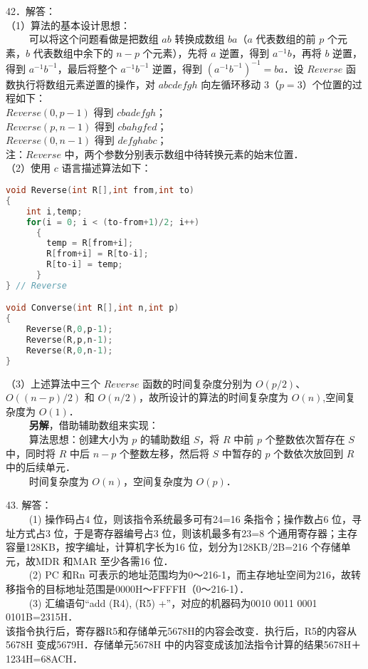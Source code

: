 42．解答：\\
（1）算法的基本设计思想：\\
$\qquad$ 可以将这个问题看做是把数组 $ab$ 转换成数组 $ba$（$a$ 代表数组的前 $p$ 个元素，$b$ 代表数组中余下的 $n-p$ 个元素），先将 $a$ 逆置，得到 $a^{-1}b$，再将 $b$ 逆置，得到 $a^{-1}b^{-1}$，最后将整个 $a^{-1}b^{-1}$ 逆置，得到 $(a^{-1}b^{-1})^{-1}=ba$．设 $Reverse$ 函数执行将数组元素逆置的操作，对 $abcdefgh$ 向左循环移动 $3$（$p=3$）个位置的过程如下：\\
$Reverse(0,p-1)$ 得到 $cbadefgh$； \\
$Reverse(p,n-1)$ 得到 $cbahgfed$； \\
$Reverse(0,n-1)$ 得到 $defghabc$； \\
注：$Reverse$ 中，两个参数分别表示数组中待转换元素的始末位置． \\
（2）使用 $c$ 语言描述算法如下：
\begin{lstlisting}[language=cpp]
void Reverse(int R[],int from,int to)
{
    int i,temp;
    for(i = 0; i < (to-from+1)/2; i++)
      {
        temp = R[from+i];
        R[from+i] = R[to-i];
        R[to-i] = temp;
      }
} // Reverse

void Converse(int R[],int n,int p)
{
    Reverse(R,0,p-1);
    Reverse(R,p,n-1);
    Reverse(R,0,n-1);
}
\end{lstlisting}
（3）上述算法中三个 $Reverse$ 函数的时间复杂度分别为 $O(p/2)$、$O((n-p)/2)$ 和 $O(n/2)$，故所设计的算法的时间复杂度为 $O(n)$,空间复杂度为 $O(1)$．\\
$\qquad$ \textbf{另解}，借助辅助数组来实现：\\
$\qquad$ 算法思想：创建大小为 $p$ 的辅助数组 $S$，将 $R$ 中前 $p$ 个整数依次暂存在 $S$ 中，同时将 $R$ 中后 $n-p$ 个整数左移，然后将 $S$ 中暂存的 $p$ 个数依次放回到 $R$ 中的后续单元．\\
$\qquad$ 时间复杂度为 $O(n)$，空间复杂度为 $O(p)$．

43. 解答：\\
$\qquad$ (1) 操作码占4 位，则该指令系统最多可有24=16 条指令；操作数占6 位，寻址方式占3 位，于是寄存器编号占3 位，则该机最多有23=8 个通用寄存器；主存容量128KB，按字编址，计算机字长为16 位，划分为128KB/2B=216 个存储单元，故MDR 和MAR 至少各需16 位．\\
$\qquad$ (2) PC 和Rn 可表示的地址范围均为0～216-1，而主存地址空间为216，故转移指令的目标地址范围是0000H～FFFFH（0～216-1）．\\
$\qquad$ (3) 汇编语句“add (R4), (R5) +”，对应的机器码为0010 0011 0001 0101B=2315H．\\
该指令执行后，寄存器R5和存储单元5678H的内容会改变．执行后，R5的内容从5678H 变成5679H．存储单元5678H 中的内容变成该加法指令计算的结果5678H＋1234H=68ACH．

